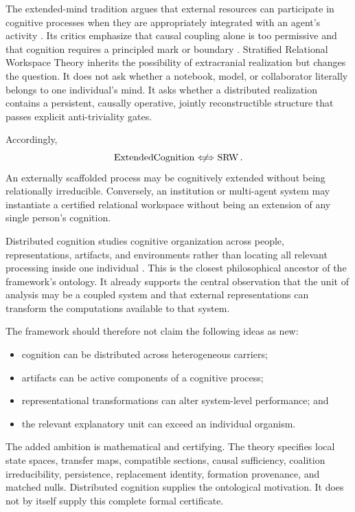 

The extended-mind tradition argues that external resources can participate in
cognitive processes when they are appropriately integrated with an agent's
activity \cite{ClarkChalmers1998}. Its critics emphasize that causal coupling
alone is too permissive and that cognition requires a principled mark or
boundary \cite{AdamsAizawa2001,Rupert2004}. Stratified Relational Workspace
Theory inherits the possibility of extracranial realization but changes the
question. It does not ask whether a notebook, model, or collaborator literally
belongs to one individual's mind. It asks whether a distributed realization
contains a persistent, causally operative, jointly reconstructible structure
that passes explicit anti-triviality gates.

Accordingly,
\[
\operatorname{ExtendedCognition}
\centernot\Longleftrightarrow
\operatorname{SRW}.
\]
An externally scaffolded process may be cognitively extended without being
relationally irreducible. Conversely, an institution or multi-agent system may
instantiate a certified relational workspace without being an extension of any
single person's cognition.


Distributed cognition studies cognitive organization across people,
representations, artifacts, and environments rather than locating all relevant
processing inside one individual \cite{Hutchins1995,HollanEtAl2000}. This is
the closest philosophical ancestor of the framework's ontology. It already
supports the central observation that the unit of analysis may be a coupled
system and that external representations can transform the computations
available to that system.

The framework should therefore not claim the following ideas as new:
\begin{itemize}
\item cognition can be distributed across heterogeneous carriers;
\item artifacts can be active components of a cognitive process;
\item representational transformations can alter system-level performance; and
\item the relevant explanatory unit can exceed an individual organism.
\end{itemize}
The added ambition is mathematical and certifying. The theory specifies local
state spaces, transfer maps, compatible sections, causal sufficiency,
coalition irreducibility, persistence, replacement identity, formation
provenance, and matched nulls. Distributed cognition supplies the ontological
motivation. It does not by itself supply this complete formal certificate.


